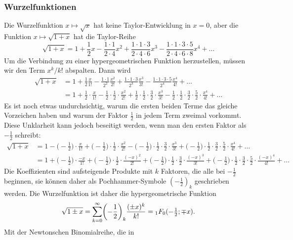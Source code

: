 \subsubsection{Wurzelfunktionen}
Die Wurzelfunktion $x\mapsto \sqrt{x}$ hat keine Taylor-Entwicklung
in $x=0$, aber die Funktion $x\mapsto\sqrt{1+x}$ hat die Taylor-Reihe
\[
\sqrt{1+x}
=
1
+
\frac12 x
-
\frac{1\cdot 1}{2\cdot 4}x^2
+
\frac{1\cdot 1\cdot 3}{2\cdot 4\cdot 6}x^3
-
\frac{1\cdot 1\cdot 3\cdot 5}{2\cdot 4\cdot 6\cdot 8}x^4
+
\dots
\]
Um die Verbindung zu einer hypergeometrischen Funktion herzustellen,
müssen wir den Term $x^k/k!$ abspalten.
Dann wird
\begin{align*}
\sqrt{1+x}
&=
1
+
\frac12 \frac{x}{1!}
-
\frac{1\cdot 1}{2^2}\frac{x^2}{2!}
+
\frac{1\cdot 1\cdot 3}{2^3}\frac{x^3}{3!}
-
\frac{1\cdot 1\cdot 3\cdot 5}{2^4}\frac{x^4}{4!}
+
\dots
\\
&=
1
+
\frac12 \cdot\frac{x}{1!}
-
\frac{1}{2}\cdot \frac{1}{2}\cdot\frac{x^2}{2!}
+
\frac{1}{2}\cdot \frac{1}2\cdot \frac{3}{2}\cdot\frac{x^3}{3!}
-
\frac{1}{2}\cdot \frac{1}{2}\cdot \frac{3}{2}\cdot \frac{5}{2}\cdot\frac{x^4}{4!}
+
\dots
\end{align*}
Es ist noch etwas undurchsichtig, warum die ersten beiden Terme
das gleiche Vorzeichen haben und warum der Faktor $\frac12$ in jedem
Term zweimal vorkommt.
Diese Unklarheit kann jedoch beseitigt werden, wenn man den ersten
Faktor als $-\frac12$ schreibt:
\begin{align*}
\sqrt{1+x}
&=
1
-
\biggl(-\frac12\biggr)\cdot\frac{x}{1!}
+
\biggl(-\frac{1}{2}\biggr)\cdot \frac{1}{2}\cdot\frac{x^2}{2!}
-
\biggl(-\frac{1}{2}\biggr)\cdot \frac{1}2\cdot \frac{3}{2}\cdot\frac{x^3}{3!}
+
\biggl(-\frac{1}{2}\biggr)\cdot \frac{1}{2}\cdot \frac{3}{2}\cdot \frac{5}{2}\cdot\frac{x^4}{4!}
+
\dots
\\
&=
1 + 
\biggl(-\frac12\biggr)\cdot\frac{-x}{1!}
+
\biggl(-\frac{1}{2}\biggr)\cdot \frac{1}{2}\cdot\frac{(-x)^2}{2!}
+
\biggl(-\frac{1}{2}\biggr)\cdot \frac{1}2\cdot \frac{3}{2}\cdot\frac{(-x)^3}{3!}
+
\biggl(-\frac{1}{2}\biggr)\cdot \frac{1}{2}\cdot \frac{3}{2}\cdot \frac{5}{2}\cdot\frac{(-x)^4}{4!}
+
\dots
\end{align*}
Die Koeffizienten sind aufsteigende Produkte mit $k$ Faktoren, die alle bei
$-\frac12$ beginnen, sie können daher als Pochhammer-Symbole $(-\frac12)_k$
geschrieben werden.
Die Wurzelfunktion ist daher die hypergeometrische Funktion
\[
\sqrt{1\pm x}
=
\sum_{k=0}^\infty
\biggl(-\frac12\biggr)_k \frac{(\pm x)^k}{k!}
=
\mathstrut_1F_0(-{\textstyle\frac12};\mp x).
\]
Mit der Newtonschen Binomialreihe, die in 
